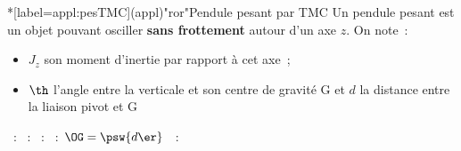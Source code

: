 \documentclass[../../main/main.tex]{subfiles}
\begin{document}
\begin{tcb*}*[label=appl:pesTMC](appl)"ror"{Pendule pesant par TMC}
	Un pendule pesant est un objet pouvant osciller \textbf{sans frottement}
	autour d'un axe $z$. On note~:
	\begin{itemize}
		\item $J_{z}$ son moment d'inertie par rapport à cet axe~;
		\item $\th$ l'angle entre la verticale et son centre de gravité G et $d$ la
		      distance entre la liaison pivot et G
	\end{itemize}
	\begin{center}
	\end{center}
	\tcblower
	\begin{minipage}[t]{0.70\linewidth}
		\begin{enumerate}[label=\sqenumi]
			~: 
			~: 
			~: 
			~: $\OG = \psw{d\er}$
			~:
			\psw{
				\[
					\begin{array}{lcc}
						\qquad\textbf{Origine}  & \textbf{Force}          & \textbf{Moment}
						\\
						\textbf{Poids}          & \quad \Pf = m\gf \quad~ & \Mc_z(\Pf) =
						-mgd \sin(\th)
						\\
						\textbf{Pivot parfaite} & \of                     & \vv{\G} = \of
					\end{array}
				\]
			}
		\end{enumerate}
	\end{minipage}
	\hfill
	\begin{minipage}[t]{0.25\linewidth}
		~\vspace*{-20pt}
		\begin{center}
\end{center}
\end{minipage}
\end{tcb*}
\end{document}
